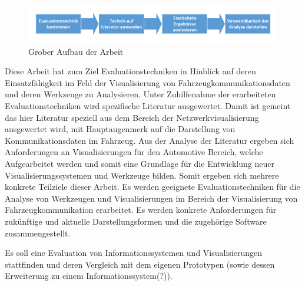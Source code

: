 \documentclass[draft=false
              ,paper=a4
              ,twoside=false
              ,fontsize=11pt
              ,headsepline
              ,BCOR10mm
              ,DIV11
              ]{scrbook}
\begin{document}
\begin{figure}[htbp]
  \centering
  \includegraphics[width=\textwidth]{img/Aufbau_grob.pdf}
  \caption{Grober Aufbau der Arbeit}
  \label{fig:aufbaugrob}
\end{figure}





Diese Arbeit hat zum Ziel Evaluationstechniken in Hinblick auf deren Einsatzfähigkeit im Feld der Visualisierung von Fahrzeugkommunikationsdaten und deren Werkzeuge zu Analysieren. Unter Zuhilfenahme der erarbeiteten Evaluationstechniken wird spezifische Literatur ausgewertet. Damit ist gemeint das hier Literatur speziell aus dem Bereich der Netzwerkvisualisierung ausgewertet wird, mit Hauptaugenmerk auf die Darstellung von Kommunikationsdaten im Fahrzeug. Aus der Analyse der Literatur ergeben sich Anforderungen an Visualisierungen für den Automotive Bereich, welche Aufgearbeitet werden und somit eine Grundlage für die Entwicklung neuer Visualisierungssystemen und Werkzeuge bilden. 
Somit ergeben sich mehrere konkrete Teilziele dieser Arbeit. Es werden geeignete Evaluationstechniken für die Analyse von Werkzeugen und Visualisierungen im Bereich der Visualisierung von Fahrzeugkommunikation erarbeitet. Es werden konkrete Anforderungen für zukünftige und aktuelle Darstellungsformen und die zugehörige Software zusammengestellt.

\iffalse
Es soll eine Evaluation von Informationssystemen und Visualisierungen stattfinden und deren Vergleich mit dem eigenen Prototypen (sowie dessen Erweiterung zu einem Informationssystem(?)). 
\end{document}
